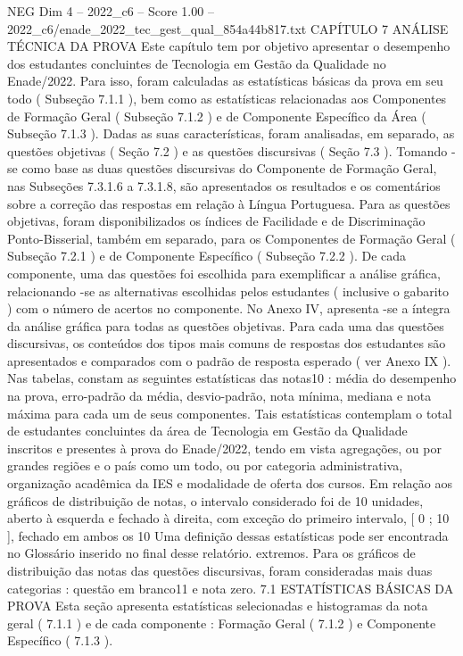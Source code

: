 \begin{textsample}{NEG Dim 4 – 2022\_c6 – Score 1.00 – 2022\_c6/enade\_2022\_tec\_gest\_qual\_854a44b817.txt}  \label{ex:f4_neg_269}
CAPÍTULO 7 ANÁLISE TÉCNICA DA PROVA Este capítulo tem por objetivo apresentar o desempenho dos estudantes concluintes de Tecnologia em Gestão da Qualidade no Enade/2022.
Para isso, foram calculadas as estatísticas básicas da prova em seu todo ( Subseção 7.1.1 ), bem como as estatísticas relacionadas aos Componentes de Formação Geral ( Subseção 7.1.2 ) e de Componente Específico da Área ( Subseção 7.1.3 ).
Dadas as suas características, foram analisadas, em separado, as questões objetivas ( Seção 7.2 ) e as questões discursivas ( Seção 7.3 ).
Tomando -se como base as duas questões discursivas do Componente de Formação Geral, nas Subseções 7.3.1.6 a 7.3.1.8, são apresentados os resultados e os comentários sobre a correção das respostas em relação à Língua Portuguesa.
Para as questões objetivas, foram disponibilizados os índices de Facilidade e de Discriminação Ponto-Bisserial, também em separado, para os Componentes de Formação Geral ( Subseção 7.2.1 ) e de Componente Específico ( Subseção 7.2.2 ).
De cada componente, uma das questões foi escolhida para exemplificar a análise gráfica, relacionando -se as alternativas escolhidas pelos estudantes ( inclusive o gabarito ) com o número de acertos no componente.
No Anexo IV, apresenta -se a íntegra da análise gráfica para todas as questões objetivas.
Para cada uma das questões discursivas, os conteúdos dos tipos mais comuns de respostas dos estudantes são apresentados e comparados com o padrão de resposta esperado ( ver Anexo IX ).
Nas tabelas, constam as seguintes estatísticas das notas10 : média do desempenho na prova, erro-padrão da média, desvio-padrão, nota mínima, mediana e nota máxima para cada um de seus componentes.
Tais estatísticas contemplam o total de estudantes concluintes da área de Tecnologia em Gestão da Qualidade inscritos e presentes à prova do Enade/2022, tendo em vista agregações, ou por grandes regiões e o país como um todo, ou por categoria administrativa, organização acadêmica da IES e modalidade de oferta dos cursos.
Em relação aos gráficos de distribuição de notas, o intervalo considerado foi de 10 unidades, aberto à esquerda e fechado à direita, com exceção do primeiro intervalo, [ 0 ; 10 ], fechado em ambos os 10 Uma definição dessas estatísticas pode ser encontrada no Glossário inserido no final desse relatório. extremos.
Para os gráficos de distribuição das notas das questões discursivas, foram consideradas mais duas categorias : questão em branco11 e nota zero. 7.1 ESTATÍSTICAS BÁSICAS DA PROVA Esta seção apresenta estatísticas selecionadas e histogramas da nota geral ( 7.1.1 ) e de cada componente : Formação Geral ( 7.1.2 ) e Componente Específico ( 7.1.3 ).

\end{textsample}
